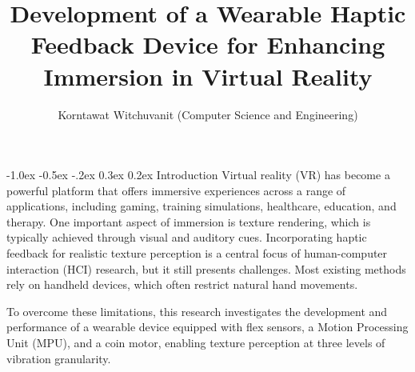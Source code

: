 \documentclass[a4paper,twocolumn]{article}
\title{\textbf{\Large Development of a Wearable Haptic Feedback Device for Enhancing Immersion in Virtual Reality}}
\author{\small{Korntawat Witchuvanit (Computer Science and Engineering)}}
\date{\vspace{-3em}}
\begin{document}
\small
\maketitle

\makeatletter
\renewcommand\section{\@startsection{section}{1}{\z@}%
  {-1.0ex \@plus -0.5ex \@minus -.2ex}%
  {0.3ex \@plus 0.2ex}%
  {\normalfont\normalsize\bfseries}}
\makeatother



\section{Introduction}
Virtual reality (VR) has become a powerful platform that offers immersive experiences across a range of applications, including gaming, training simulations, healthcare, education, and therapy.%
One important aspect of immersion is texture rendering, which is typically achieved through visual and auditory cues. Incorporating haptic feedback for realistic texture perception is a central focus of human-computer interaction (HCI) research, but it still presents challenges. Most existing methods rely on handheld devices, which often restrict natural hand movements.

To overcome these limitations, this research investigates the development and performance of a wearable device equipped with flex sensors, a Motion Processing Unit (MPU), and a coin motor, enabling texture perception at three levels of vibration granularity.
\end{document}
